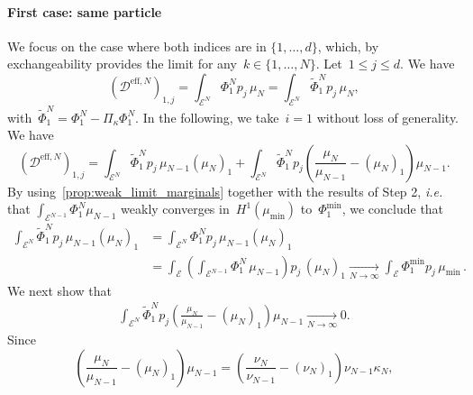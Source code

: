 \documentclass[onefignum,onetabnum]{siamart251216} %
\newcommand{\mc}[1]{\mathcal{#1}}
\renewcommand{\leq}{\leqslant}
\newcommand{\mescin}{\mu}
\newcommand{\mespos}{\nu}
\newcommand{\mesvit}{\kappa}
\newcommand{\DeffN}{\mc{D}^{\mathrm{eff},N}}
\newcommand{\projvit}{\Pi_{\kappa}}
\newcommand{\vQ}[1]{\mathbf{q}^{#1}}
\theoremstyle{plain}
\numberwithin{equation}{section}
\numberwithin{theorem}{section}
\newcounter{ucounter}
\newcommand{\uv}[1]{
  \stepcounter{ucounter}
  \textcolor{orange}{
      \\[.2cm]
    U, comment \arabic{ucounter}. #1
    \\[.2cm]
  }
}
\renewcommand{\uv}[1]{\textcolor{orange}{#1}}
\begin{document}
\paragraph{First case: same particle}
We focus on the case where both indices are in $\{1,\dots,d\}$, which, by exchangeability provides the limit for any~$k\in\{1,\dots,N\}$. Let~$1\leq j\leq d$.
We have
\[
(\DeffN)_{1,j} = \int_{\mc{E}^N}\Phi^N_1 p_j\,\mescin_N = \int_{\mc{E}^N}\widetilde\Phi^N_1 p_j\,\mescin_N,
\]
with~$\widetilde\Phi^N_1 = \Phi^N_1 - \projvit\Phi_1^N$.
In the following, we take~$i = 1$ without loss of generality. We have
\[
(\DeffN)_{1,j} = \int_{\mc{E}^N}\widetilde\Phi^N_1 p_j\,\mescin_{N-1}(\mescin_{N})_1
+ \int_{\mc{E}^N}\widetilde\Phi^N_1 p_j\left(\frac{\mescin_N}{\mescin_{N-1}}-(\mescin_{N})_1\right)\mescin_{N-1}.
\]
By using~\cref{prop:weak_limit_marginals} together with the results of Step 2, \textit{i.e.} that $\displaystyle\int_{\mc{E}^{N-1}} \Phi^N_1 \mescin_{N-1}$ weakly converges in~$H^1(\mescin_{\min})$  to~$\Phi^{\min}_1$,
we conclude that
\begin{align*}
    \int_{\mc{E}^N} \widetilde \Phi^N_1 p_j\,\mescin_{N-1}(\mescin_{N})_1 
    &= \int_{\mc{E}^N} \Phi^N_1 p_j\,\mescin_{N-1}(\mescin_{N})_1 
    \\
    &= \int_{\mc{E}}\left(\int_{\mc{E}^{N-1}} \Phi^N_1 \,\mescin_{N-1}\right) p_j\,(\mescin_{N})_1
    \xrightarrow[N\to \infty]{}\int_{\mc{E}}\Phi^{\min}_1 p_j\,\mescin_{{\min}} \, .
\end{align*}
We next show that
\begin{align}
    \label{eq:remainder_covariance}
    \int_{\mc{E}^N}\widetilde\Phi^N_1 p_j\left(\frac{\mescin_N}{\mescin_{N-1}}-(\mescin_{N})_1\right)\mescin_{N-1} \xrightarrow[N\to \infty]{} 0.
\end{align}
Since
\[
\left(\frac{\mescin_N}{\mescin_{N-1}}-(\mescin_{N})_1\right)\mescin_{N-1}
= \left(\frac{\mespos_N}{\mespos_{N-1}} - (\mespos_N)_1\right)\mespos_{N-1}\mesvit_N,
\]
\end{document}
